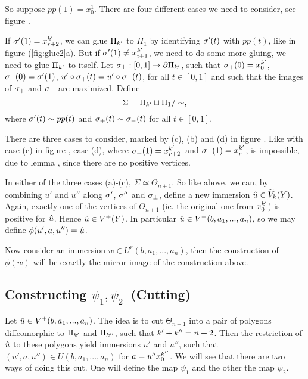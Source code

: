 So suppose $
pp(1) = x^1_0$. There are four different cases we need to
consider, see figure .


If $\sigma'(1)=x^{k'}_{r+2}$, we can glue $\Pi_{k'}$ to $\Pi_1$ by identifying
$\sigma'(t)$ with
$
pp(t)$, like in figure (\ref{fig:glue2}a). But if $\sigma'(1) \ne
x^{k'}_{i+1}$, we need to do some more gluing, we need to glue $\Pi_{k'}$ to itself.
Let $\sigma_\pm: [0,1] \to \partial \Pi_{k'}$, such that $\sigma_+(0) = x^{k'}_0$,
$\sigma_-(0) = \sigma'(1)$, $u' \circ \sigma_+(t) = u' \circ \sigma_-(t)$, for all $t\in[0,1]$ and
such that the images of $\sigma_+$ and $\sigma_-$ are maximized. Define 
\[ \Sigma = \Pi_{k'} \sqcup \Pi_1 / \sim, \]
where $\sigma'(t) \sim 
pp(t)$ and $\sigma_+(t) \sim \sigma_-(t)$ for all $t\in[0,1]$.

There are three cases to consider, marked by (c), (b) and (d) in figure
. Like with case (c) in figure , case (d), where
$\sigma_+(1) = x^{k'}_{r+2}$ and $\sigma_-(1) = x^{k'}_{r}$, is impossible, due to lemma
, since there are no positive vertices. 

In either of the three cases (a)-(c), $\Sigma \simeq \Theta_{n+1}$. 
So like above, we can, by combining $u'$ and $u''$ along $\sigma'$, $\sigma''$ and
$\sigma_\pm$, define a new immersion $\hat{u}\in \widetilde{V}_k(Y)$. Again, exactly one of the
vertices of $\Theta_{n+1}$ (ie. the original one from $x^{k'}_0$) is positive
for $\hat{u}$. Hence $\hat{u}\in V^+(Y)$. In particular $\hat{u} \in V^+(b,a_1,...,a_n)$, so
we may define $\phi(u',a,u'') = \hat{u}$.

Now consider an immersion $w \in U^r(b,a_1,...,a_n)$, then the
construction of $\phi(w)$ will be exactly the mirror image of the
construction above. 

\newcommand{\up}{{u'}}
\newcommand{\upp}{{u''}}
\newcommand{\half}{\frac{1}{2}}

\renewcommand{\k}{{n+1}}

\subsection{Constructing $\psi_1,\psi_2$ (Cutting)}
Let $\hat{u} \in V^+(b,a_1,...,a_n)$. The idea is to cut $\Theta_\k$ into a pair of
polygons diffeomorphic to $\Pi_{k'}$ and $\Pi_{k''}$, such that ${k'} + {k''} =
n+2$. Then the restriction of $\hat{u}$ to these polygons yield immersions
$\up$ and $\upp$, such that $(\up, a, \upp) \in U(b,a_1,...,a_n)$ for $a =
\upp{x^\kpp_0}$. We will see that there are two ways of doing this cut. One
will define the map $\psi_1$ and the other the map $\psi_2$.

